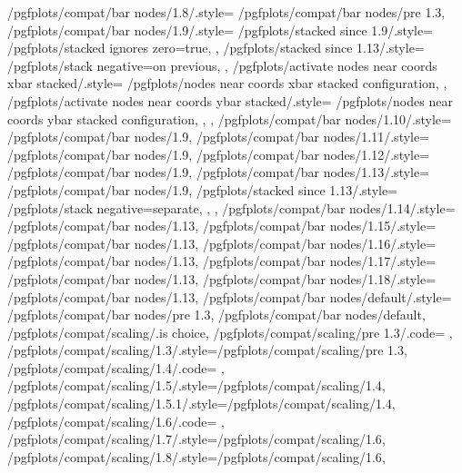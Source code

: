 {	/pgfplots/compat/bar nodes/1.8/.style=		{/pgfplots/compat/bar nodes/pre 1.3},%
	/pgfplots/compat/bar nodes/1.9/.style=		{
		/pgfplots/stacked since 1.9/.style={
			/pgfplots/stacked ignores zero=true,%
		},
		/pgfplots/stacked since 1.13/.style={
			/pgfplots/stack negative=on previous,%
		},%
		/pgfplots/activate nodes near coords xbar stacked/.style={
			/pgfplots/nodes near coords xbar stacked configuration,
		},
		/pgfplots/activate nodes near coords ybar stacked/.style={
			/pgfplots/nodes near coords ybar stacked configuration,
		},
	},%
	/pgfplots/compat/bar nodes/1.10/.style=		{/pgfplots/compat/bar nodes/1.9},%
	/pgfplots/compat/bar nodes/1.11/.style=		{/pgfplots/compat/bar nodes/1.9},%
	/pgfplots/compat/bar nodes/1.12/.style=		{/pgfplots/compat/bar nodes/1.9},%
	/pgfplots/compat/bar nodes/1.13/.style=		{
		/pgfplots/compat/bar nodes/1.9,
		/pgfplots/stacked since 1.13/.style={
			/pgfplots/stack negative=separate,
		},%
	},%
	/pgfplots/compat/bar nodes/1.14/.style=		{/pgfplots/compat/bar nodes/1.13},%
	/pgfplots/compat/bar nodes/1.15/.style=		{/pgfplots/compat/bar nodes/1.13},%
	/pgfplots/compat/bar nodes/1.16/.style=		{/pgfplots/compat/bar nodes/1.13},%
	/pgfplots/compat/bar nodes/1.17/.style=		{/pgfplots/compat/bar nodes/1.13},%
	/pgfplots/compat/bar nodes/1.18/.style=		{/pgfplots/compat/bar nodes/1.13},%
	/pgfplots/compat/bar nodes/default/.style=	{/pgfplots/compat/bar nodes/pre 1.3},%
	/pgfplots/compat/bar nodes/default,
	/pgfplots/compat/scaling/.is choice,
	/pgfplots/compat/scaling/pre 1.3/.code={%
		\def\pgfplots@compat@scaling@zunitfix@enable{0}%
		\def\pgfplots@compat@scaling@coordmath{pgfbasic}%
		\def\pgfplots@compat@scaling@coordmath@final{pgfbasic}%
	},
	/pgfplots/compat/scaling/1.3/.style={/pgfplots/compat/scaling/pre 1.3},
	/pgfplots/compat/scaling/1.4/.code={%
		\def\pgfplots@compat@scaling@zunitfix@enable{1}%
		\def\pgfplots@compat@scaling@coordmath{float}%
		\def\pgfplots@compat@scaling@coordmath@final{pgfbasic}%
	},
	/pgfplots/compat/scaling/1.5/.style={/pgfplots/compat/scaling/1.4},
	/pgfplots/compat/scaling/1.5.1/.style={/pgfplots/compat/scaling/1.4},
	/pgfplots/compat/scaling/1.6/.code={%
		\def\pgfplots@compat@scaling@zunitfix@enable{1}%
		\def\pgfplots@compat@scaling@coordmath{float}%
		\def\pgfplots@compat@scaling@coordmath@final{float}%
	},
	/pgfplots/compat/scaling/1.7/.style={/pgfplots/compat/scaling/1.6},
	/pgfplots/compat/scaling/1.8/.style={/pgfplots/compat/scaling/1.6},
}
